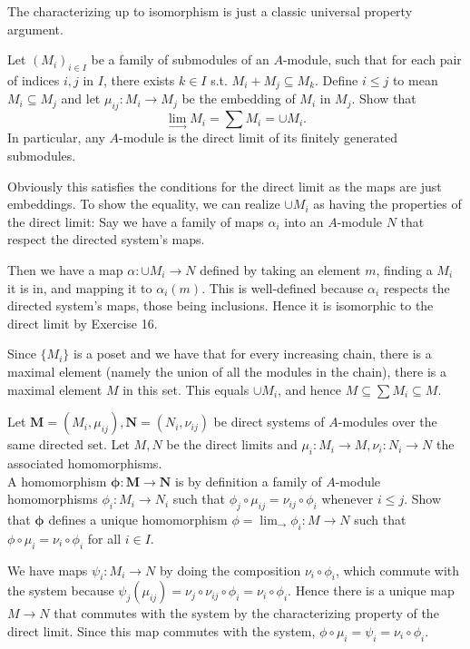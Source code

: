 \documentclass[a4paper]{exam}
\begin{document}
\begin{questions}
\begin{solution}
		The characterizing up to isomorphism is just a classic universal property argument.
	\end{solution}

	\question Let $(M_i)_{i\in I} $ be a family of submodules of an $A $-module, such that for each pair of indices $i,j $ in $I $, there exists $k\in I $ s.t. $M_i + M_j \subseteq M_k $. Define $i\le j $ to mean $M_i \subseteq M_j $ and let $\mu _{ij}: M_i\to M_j $ be the embedding of $M_i $ in $M_j $. Show that
	\[
		\lim_{\rightarrow} M_i = \sum M_i = \cup M_i
	.\]
	In particular, any $A $-module is the direct limit of its finitely generated submodules.
	\begin{solution}
		Obviously this satisfies the conditions for the direct limit as the maps are just embeddings.
		To show the equality, we can realize $\cup M_i $ as having the properties of the direct limit:
		Say we have a family of maps $\alpha _i $ into an $A $-module $N $ that respect the directed system's maps.

		Then we have a map $\alpha :\cup M_i \to N$ defined by taking an element $m $, finding a $ M_i$ it is in, and mapping it to $\alpha _i(m) $.
		This is well-defined because $\alpha _i $ respects the directed system's maps, those being inclusions.
		Hence it is isomorphic to the direct limit by Exercise 16.

		Since $\{M_i\}   $ is a poset and we have that for every increasing chain, there is a maximal element (namely the union of all the modules in the chain), there is a maximal element $M $ in this set.
		This equals $\cup M_i $, and hence $M \subseteq \sum M_i \subseteq M $.
	\end{solution}

	\question Let $\bm{M} = (M_i, \mu_{ij}), \bm{N}=(N_i,\nu_{ij}) $ be direct systems of $A $-modules over the same directed set. Let $M,N $ be the direct limits and $\mu _i: M_i\to M , \nu_i: N_i \to N$ the associated homomorphisms.\\
	A homomorphism $\bm{\phi}:\bm{M}\to \bm{N} $ is by definition a family of $A $-module homomorphisms $\phi_i:M_i\to N_i $ such that $\phi _j \circ \mu_{ij}=\nu_{ij}\circ \phi_i $ whenever $i\le j $. Show that $\bm{\phi} $ defines a unique homomorphism $\phi = \lim_{\rightarrow} \phi_i: M\to N $ such that $\phi\circ \mu_i = \nu_i\circ \phi_i $ for all $i\in I $.
	\begin{solution}
		We have maps $\psi_i: M_i\to N $ by doing the composition $\nu_i\circ \phi_i $, which commute with the system because $\psi_j(\mu_{ij}) = \nu_j\circ \nu_{ij}\circ \phi_i = \nu_i\circ \phi_i$.
		Hence there is a unique map $M\to N $ that commutes with the system by the characterizing property of the direct limit.
		Since this map commutes with the system, $\phi\circ \mu_i = \psi_i = \nu_i \circ \phi_i $.
	\end{solution}


\end{questions}
\end{document}
